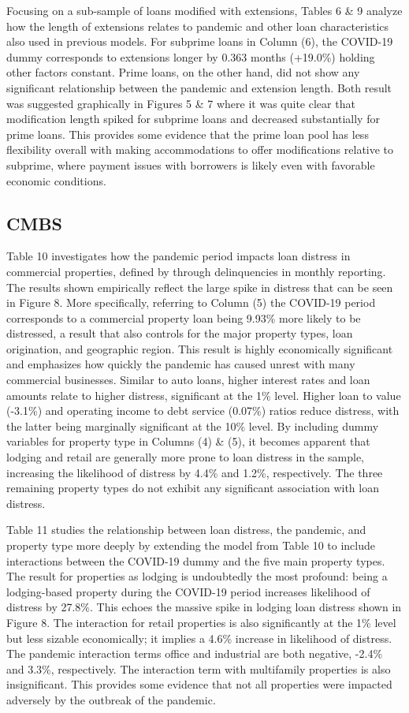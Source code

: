\documentclass[10.5pt]{article}
\begin{document}
Focusing on a sub-sample of loans modified with extensions, Tables 6 \& 9 analyze how the length of extensions relates to pandemic and other loan characteristics also used in previous models. For subprime loans in Column (6), the COVID-19 dummy corresponds to extensions longer by 0.363 months (+19.0\%) holding other factors constant. Prime loans, on the other hand, did not show any significant relationship between the pandemic and extension length. Both result was suggested graphically in Figures 5 \& 7 where it was quite clear that modification length spiked for subprime loans and decreased substantially for prime loans. This provides some evidence that the prime loan pool has less flexibility overall with making accommodations to offer modifications relative to subprime, where payment issues with borrowers is likely even with favorable economic conditions.  

\subsection{CMBS}

Table 10 investigates how the pandemic period impacts loan distress in commercial properties, defined by through delinquencies in monthly reporting. The results shown empirically reflect the large spike in distress that can be seen in Figure 8. More specifically, referring to Column (5) the COVID-19 period corresponds to a commercial property loan being 9.93\% more likely to be distressed, a result that also controls for the major property types, loan origination, and geographic region. This result is highly economically significant and emphasizes how quickly the pandemic has caused unrest with many commercial businesses. Similar to auto loans, higher interest rates and loan amounts relate to higher distress, significant at the 1\% level. Higher loan to value (-3.1\%) and operating income to debt service (0.07\%) ratios reduce distress, with the latter being marginally significant at the 10\% level. By including dummy variables for property type in Columns (4) \& (5), it becomes apparent that lodging and retail are generally more prone to loan distress in the sample, increasing the likelihood of distress by 4.4\% and 1.2\%, respectively. The three remaining property types do not exhibit any significant association with loan distress.  

Table 11 studies the relationship between loan distress, the pandemic, and property type more deeply by extending the model from Table 10 to include interactions between the COVID-19 dummy and the five main property types. The result for properties as lodging is undoubtedly the most profound: being a lodging-based property during the COVID-19 period increases likelihood of distress by 27.8\%. This echoes the massive spike in lodging loan distress shown in Figure 8. The interaction for retail properties is also significantly at the 1\% level but less sizable economically; it implies a 4.6\% increase in likelihood of distress. The pandemic interaction terms office and industrial are both negative, -2.4\% and 3.3\%, respectively. The interaction term with multifamily properties is also insignificant. This provides some evidence that not all properties were impacted adversely by the outbreak of the pandemic. 
\end{document}
